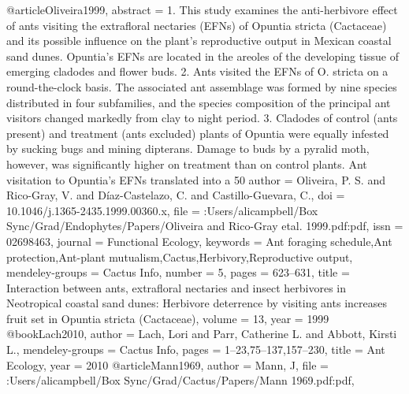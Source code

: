 @article{Oliveira1999,
abstract = {1. This study examines the anti-herbivore effect of ants visiting the extrafloral nectaries (EFNs) of Opuntia stricta (Cactaceae) and its possible influence on the plant's reproductive output in Mexican coastal sand dunes. Opuntia's EFNs are located in the areoles of the developing tissue of emerging cladodes and flower buds. 2. Ants visited the EFNs of O. stricta on a round-the-clock basis. The associated ant assemblage was formed by nine species distributed in four subfamilies, and the species composition of the principal ant visitors changed markedly from clay to night period. 3. Cladodes of control (ants present) and treatment (ants excluded) plants of Opuntia were equally infested by sucking bugs and mining dipterans. Damage to buds by a pyralid moth, however, was significantly higher on treatment than on control plants. Ant visitation to Opuntia's EFNs translated into a 50%
author = {Oliveira, P. S. and Rico-Gray, V. and D{\'{i}}az-Castelazo, C. and Castillo-Guevara, C.},
doi = {10.1046/j.1365-2435.1999.00360.x},
file = {:Users/alicampbell/Box Sync/Grad/Endophytes/Papers/Oliveira and Rico-Gray etal. 1999.pdf:pdf},
issn = {02698463},
journal = {Functional Ecology},
keywords = {Ant foraging schedule,Ant protection,Ant-plant mutualism,Cactus,Herbivory,Reproductive output},
mendeley-groups = {Cactus Info},
number = {5},
pages = {623--631},
title = {{Interaction between ants, extrafloral nectaries and insect herbivores in Neotropical coastal sand dunes: Herbivore deterrence by visiting ants increases fruit set in Opuntia stricta (Cactaceae)}},
volume = {13},
year = {1999}
}
@book{Lach2010,
author = {Lach, Lori and Parr, Catherine L. and Abbott, Kirsti L.},
mendeley-groups = {Cactus Info},
pages = {1--23,75--137,157--230},
title = {{Ant Ecology}},
year = {2010}
}
@article{Mann1969,
author = {Mann, J},
file = {:Users/alicampbell/Box Sync/Grad/Cactus/Papers/Mann 1969.pdf:pdf},
}}
